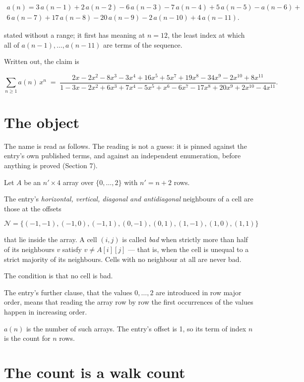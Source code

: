 \documentclass[11pt]{article}
\theoremstyle{definition}
\begin{document}
\begin{multline*} a(n) = 3\,a(n-1) + 2\,a(n-2) - 6\,a(n-3) - 7\,a(n-4) + 5\,a(n-5) - a(n-6) + \\ 6\,a(n-7) + 17\,a(n-8) - 20\,a(n-9) - 2\,a(n-10) + 4\,a(n-11). \end{multline*}

stated without a range; it first has meaning at $n = 12$, the least index at which all of $a(n-1),\dots,a(n-11)$ are terms of the sequence.

Written out, the claim is

\[\sum_{n \ge 1} a(n)\,x^n \;=\; \frac{2x - 2x^{2} - 8x^{3} - 3x^{4} + 16x^{5} + 5x^{7} + 19x^{8} - 34x^{9} - 2x^{10} + 8x^{11}}{1 - 3x - 2x^{2} + 6x^{3} + 7x^{4} - 5x^{5} + x^{6} - 6x^{7} - 17x^{8} + 20x^{9} + 2x^{10} - 4x^{11}}.\]

\section{The object}

The name is read as follows. The reading is not a guess: it is pinned against the entry's own published terms, and against an independent enumeration, before anything is proved (Section 7).

Let $A$ be an $n' \times 4$ array over $\{0,\dots,2\}$ with $n' = n + 2$ rows.

The entry's {\itshape horizontal, vertical, diagonal and antidiagonal} neighbours of a cell are those at the offsets

\[\mathcal{N} = \{(-1,-1), (-1,0), (-1,1), (0,-1), (0,1), (1,-1), (1,0), (1,1)\}\]

that lie inside the array. A cell $(i,j)$ is called {\itshape bad} when strictly more than half of its neighbours $v$ satisfy $v \ne A[i][j]$ --- that is, when the cell is unequal to a strict majority of its neighbours. Cells with no neighbour at all are never bad.

The condition is that no cell is bad.

The entry's further clause, that the values $0,\dots,2$ are introduced in row major order, means that reading the array row by row the first occurrences of the values happen in increasing order.

$a(n)$ is the number of such arrays. The entry's offset is 1, so its term of index $n$ is the count for $n$ rows.

\section{The count is a walk count}
\end{document}
